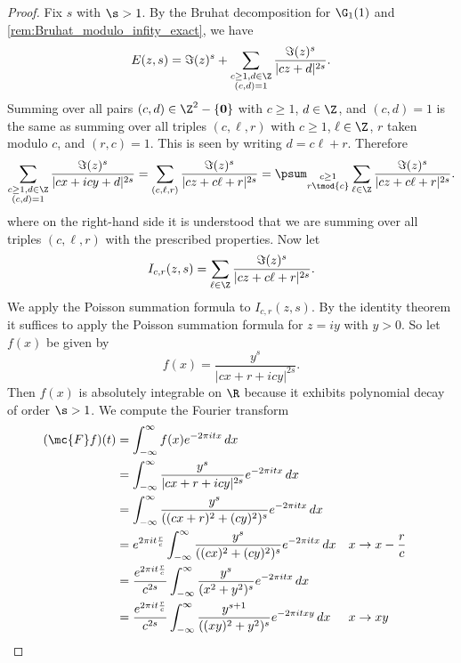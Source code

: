       \begin{proof}
        Fix $s$ with $\s > 1$. By the Bruhat decomposition for $\G_{1}(1)$ and \cref{rem:Bruhat_modulo_infity_exact}, we have
        \[
          E(z,s) = \Im(z)^{s}+\sum_{\substack{c \ge 1, d \in \Z \\ (c,d) = 1}}\frac{\Im(z)^{s}}{|cz+d|^{2s}}.
        \]
        Summing over all pairs $(c,d) \in \Z^{2}-\{\mathbf{0}\}$ with $c \ge 1$, $d \in \Z$, and $(c,d) = 1$ is the same as summing over all triples $(c,\ell,r)$ with $c \ge 1$, $\ell \in \Z$, $r$ taken modulo $c$, and $(r,c) = 1$. This is seen by writing $d = c\ell+r$. Therefore
        \[
          \sum_{\substack{c \ge 1, d \in \Z \\ (c,d) = 1}}\frac{\Im(z)^{s}}{|cx+icy+d|^{2s}} = \sum_{(c,\ell,r)}\frac{\Im(z)^{s}}{|cz+c\ell+r|^{2s}} = \psum_{\substack{c \ge 1 \\ r \tmod{c}}}\sum_{\ell \in \Z}\frac{\Im(z)^{s}}{|cz+c\ell+r|^{2s}}.
        \]
         where on the right-hand side it is understood that we are summing over all triples $(c,\ell,r)$ with the prescribed properties. Now let
        \[
          I_{c,r}(z,s) = \sum_{\ell \in \Z}\frac{\Im(z)^{s}}{|cz+c\ell+r|^{2s}}.
        \]
        We apply the Poisson summation formula to $I_{c,r}(z,s)$. By the identity theorem it suffices to apply the Poisson summation formula for $z = iy$ with $y > 0$. So let $f(x)$ be given by
        \[
          f(x) = \frac{y^{s}}{|cx+r+icy|^{2s}}.
        \]
        Then $f(x)$ is absolutely integrable on $\R$ because it exhibits polynomial decay of order $\s > 1$. We compute the Fourier transform
        \begin{align*}
          (\mc{F}f)(t) &= \int_{-\infty}^{\infty}f(x)e^{-2\pi itx}\,dx \\
          &= \int_{-\infty}^{\infty}\frac{y^{s}}{|cx+r+icy|^{2s}}e^{-2\pi itx}\,dx \\
          &= \int_{-\infty}^{\infty}\frac{y^{s}}{((cx+r)^{2}+(cy)^{2})^{s}}e^{-2\pi itx}\,dx \\
          &= e^{2\pi it\frac{r}{c}}\int_{-\infty}^{\infty}\frac{y^{s}}{((cx)^{2}+(cy)^{2})^{s}}e^{-2\pi itx}\,dx && \text{$x \to x-\frac{r}{c}$} \\
          &= \frac{e^{2\pi it\frac{r}{c}}}{c^{2s}}\int_{-\infty}^{\infty}\frac{y^{s}}{(x^{2}+y^{2})^{s}}e^{-2\pi itx}\,dx \\
          &= \frac{e^{2\pi it\frac{r}{c}}}{c^{2s}}\int_{-\infty}^{\infty}\frac{y^{s+1}}{((xy)^{2}+y^{2})^{s}}e^{-2\pi itxy}\,dx && \text{$x \to xy$} \\

\end{align*}
\end{proof}
